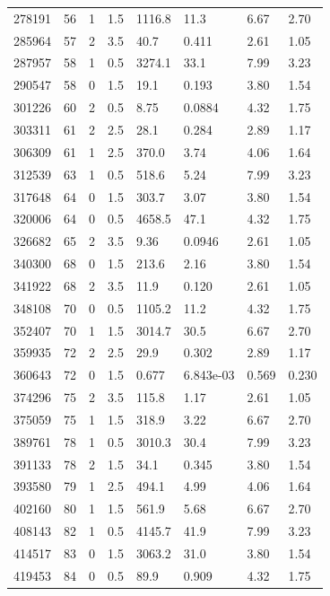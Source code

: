\documentclass[preview]{standalone}
\begin{document}
{{{\begin{tabular}{L{1.2cm}C{1.2cm} C{0.3cm}C{0.5cm} C{1.4cm}C{1.4cm} C{1.4cm}C{1.4cm}}
  278191  &    56  & 1     & 1.5 &  1116.8  & 11.3  & 6.67 &  2.70   \\ 
  285964  &    57  & 2     & 3.5 &  40.7  & 0.411  & 2.61 &  1.05   \\ 
  287957  &    58  & 1     & 0.5 &  3274.1  & 33.1  & 7.99 &  3.23   \\ 
  290547  &    58  & 0     & 1.5 &  19.1  & 0.193  & 3.80 &  1.54   \\ 
  301226  &    60  & 2     & 0.5 &  8.75  & 0.0884  & 4.32 &  1.75   \\ 
  303311  &    61  & 2     & 2.5 &  28.1  & 0.284  & 2.89 &  1.17   \\ 
  306309  &    61  & 1     & 2.5 &  370.0  & 3.74  & 4.06 &  1.64   \\ 
  312539  &    63  & 1     & 0.5 &  518.6  & 5.24  & 7.99 &  3.23   \\ 
  317648  &    64  & 0     & 1.5 &  303.7  & 3.07  & 3.80 &  1.54   \\ 
  320006  &    64  & 0     & 0.5 &  4658.5  & 47.1  & 4.32 &  1.75   \\ 
  326682  &    65  & 2     & 3.5 &  9.36  & 0.0946  & 2.61 &  1.05   \\ 
  340300  &    68  & 0     & 1.5 &  213.6  & 2.16  & 3.80 &  1.54   \\ 
  341922  &    68  & 2     & 3.5 &  11.9  & 0.120  & 2.61 &  1.05   \\ 
  348108  &    70  & 0     & 0.5 &  1105.2  & 11.2  & 4.32 &  1.75   \\ 
  352407  &    70  & 1     & 1.5 &  3014.7  & 30.5  & 6.67 &  2.70   \\ 
  359935  &    72  & 2     & 2.5 &  29.9  & 0.302  & 2.89 &  1.17   \\ 
  360643  &    72  & 0     & 1.5 &  0.677  & 6.843e-03  & 0.569 &  0.230   \\ 
  374296  &    75  & 2     & 3.5 &  115.8  & 1.17  & 2.61 &  1.05   \\ 
  375059  &    75  & 1     & 1.5 &  318.9  & 3.22  & 6.67 &  2.70   \\ 
  389761  &    78  & 1     & 0.5 &  3010.3  & 30.4  & 7.99 &  3.23   \\ 
  391133  &    78  & 2     & 1.5 &  34.1  & 0.345  & 3.80 &  1.54   \\ 
  393580  &    79  & 1     & 2.5 &  494.1  & 4.99  & 4.06 &  1.64   \\ 
  402160  &    80  & 1     & 1.5 &  561.9  & 5.68  & 6.67 &  2.70   \\ 
  408143  &    82  & 1     & 0.5 &  4145.7  & 41.9  & 7.99 &  3.23   \\ 
  414517  &    83  & 0     & 1.5 &  3063.2  & 31.0  & 3.80 &  1.54   \\ 
  419453  &    84  & 0     & 0.5 &  89.9  & 0.909  & 4.32 &  1.75   \\ 
\hline 
\end{tabular} 

}}}
\end{document}
